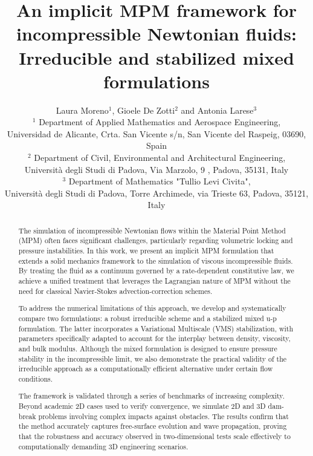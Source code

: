 \documentclass[11pt,english]{article}
\title{An implicit MPM framework for incompressible Newtonian fluids: Irreducible and stabilized mixed formulations}
\begin{document}
\linenumbers
\author{Laura Moreno$^{1}$, Gioele De Zotti$^{2}$ and Antonia Larese$^{3}$ \\
{\footnotesize{}{}$^{1}$ Department of Applied Mathematics and Aerospace Engineering,\\ Universidad de Alicante, Crta. San Vicente s/n, 
San Vicente del Raspeig, 03690, Spain}\\
{\footnotesize{}{} $^{2}$ Department of Civil, Environmental and Architectural Engineering, \\ Università degli Studi di Padova, Via Marzolo, 9 , Padova, 35131, Italy}\\
{\footnotesize{}{}$^{3}$ Department of Mathematics "Tullio Levi Civita",\\ Università degli Studi di Padova, 
Torre Archimede, via Trieste 63,  Padova, 35121, Italy}}

\maketitle




\begin{abstract}
    The simulation of incompressible Newtonian flows within the Material Point Method (MPM) often faces significant challenges, particularly regarding volumetric locking and pressure instabilities. In this work, we present an implicit MPM formulation that extends a solid mechanics framework to the simulation of viscous incompressible fluids. By treating the fluid as a continuum governed by a rate-dependent constitutive law, we achieve a unified treatment that leverages the Lagrangian nature of MPM without the need for classical Navier-Stokes advection-correction schemes.

    To address the numerical limitations of this approach, we develop and systematically compare two formulations: a robust irreducible scheme and a stabilized mixed u-p formulation. The latter incorporates a Variational Multiscale (VMS) stabilization, with parameters specifically adapted to account for the interplay between density, viscosity, and bulk modulus. Although the mixed formulation is designed to ensure pressure stability in the incompressible limit, we also demonstrate the practical validity of the irreducible approach as a computationally efficient alternative under certain flow conditions.

    The framework is validated through a series of benchmarks of increasing complexity. Beyond academic 2D cases used to verify convergence, we simulate 2D and 3D dam-break problems involving complex impacts against obstacles. The results confirm that the method accurately captures free-surface evolution and wave propagation, proving that the robustness and accuracy observed in two-dimensional tests scale effectively to computationally demanding 3D engineering scenarios.
\end{abstract}
\end{document}
